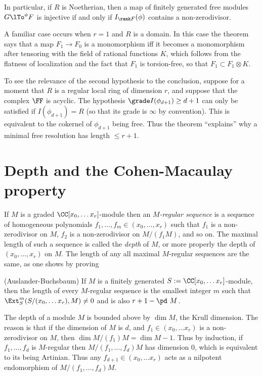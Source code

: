 In particular, if $R$ is Noetherian, then a map of finitely generated free modules  $G\lTo^{\phi}F$ is injective 
if and only if $I_{\rank F}(\phi)$ contains a non-zerodivisor.

A familiar case occurs when  $r=1$ and $R$ is a domain. In this case the theorem says that a map $F_1\to F_0$ is a monomorphism iff it becomes a monomorphism after tensoring with the field of rational functions $K$, which follows from the flatness of
localization and the fact that $F_1$ is torsion-free, so that
$F_1 \subset F_1 \otimes K$. 

To see the relevance of the second hypothesis to the conclusion, suppose for a moment that $R$ is
a regular local ring of dimension $r$, and suppose that the complex $\FF$ is acyclic. The hypothesis $\grade I(\phi_{d+1}) \geq d+1$ can only be satisfied if $I(\phi_{d+1}) = R$ (so that its grade is $\infty$ by convention). This  is equivalent to the cokernel of $\phi_{d+1}$ being free. Thus the theorem ``explains'' why a minimal free resolution
has length $\leq r+1$.

\section{Depth and the Cohen-Macaulay property}

If $M$ is a graded  $\CC[x_0, \dots x_r]$-module then an \emph{$M$-regular sequence} is a sequence of homogeneous polynomials
$f_1,\dots,f_m \in (x_0,\dots, x_r)$ such that $f_1$ is a non-zerodivisor on $M$, $f_2$ is a non-zerodivisor on $M/(f_1M)$, and so on. 
The maximal length of such a sequence is called the \emph{depth} of $M$, or more properly the depth of $(x_0,\dots, x_r)$ on $M$.
The length of any all maximal $M$-regular sequences are the same, as one shows by proving

\begin{theorem} (Auslander-Buchsbaum)\label{Auslander-Buchsbaum}
If $M$ is a finitely generated $S := \CC[x_0, \dots x_r]$-module, then the length of every $M$-regular sequence is
the smallest integer $m$ such that $\Ext_S^m(S/(x_0, \dots x_r), M) \neq 0$ and is also $r+1 - \pd\  M$.
\end{theorem}
 
 The depth of a module $M$ is bounded above by $\dim M$, the Krull dimension. The reason is that if the dimension of $M$
 is $d$, and $f_1 \in (x_0, \dots x_r) $ is a non-zerodivisor on $M$, then $\dim M/(f_1)M= \dim M-1$. Thus by induction, if
  $f_1,\dots, f_d$ is $M$-regular then $M/(f_1, \dots, f_d)M$ has dimension 0, which is equivalent to its being Artinian. Thus any 
$ f_{d+1} \in(x_0, \dots x_r) $ acts as a nilpotent endomorphism of $M/(f_1, \dots, f_d)M$.

